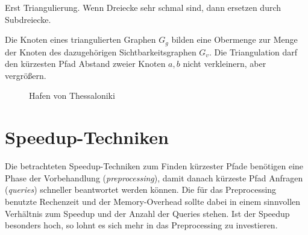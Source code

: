 
Erst Triangulierung. Wenn Dreiecke sehr schmal sind, dann ersetzen durch Subdreiecke.

Die Knoten eines triangulierten Graphen $G_g$ bilden eine Obermenge zur Menge der Knoten des dazugehörigen Sichtbarkeitsgraphen $G_v$.
Die Triangulation darf den kürzesten Pfad Abstand zweier Knoten $a, b$ nicht verkleinern, aber vergrößern.

\begin{figure}[ht]%
  \centering
  \caption{Hafen von Thessaloniki}%
  \label{fig:thessaloniki_comparison}%
\end{figure}

\section{Speedup-Techniken}

Die betrachteten Speedup-Techniken zum Finden kürzester Pfade benötigen eine Phase der Vorbehandlung (\emph{preprocessing}), damit danach kürzeste Pfad Anfragen (\emph{queries}) schneller beantwortet werden können.
Die für das Preprocessing benutzte Rechenzeit und der Memory-Overhead sollte dabei in einem sinnvollen Verhältnis zum Speedup und der Anzahl der Queries stehen.
Ist der Speedup besonders hoch, so lohnt es sich mehr in das Preprocessing zu investieren.

